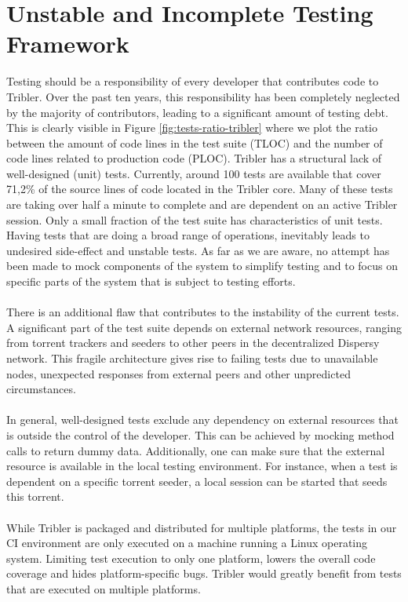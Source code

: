 \section{Unstable and Incomplete Testing Framework}
Testing should be a responsibility of every developer that contributes code to Tribler. Over the past ten years, this responsibility has been completely neglected by the majority of contributors, leading to a significant amount of testing debt. This is clearly visible in Figure \ref{fig:tests-ratio-tribler} where we plot the ratio between the amount of code lines in the test suite (TLOC) and the number of code lines related to production code (PLOC). Tribler has a structural lack of well-designed (unit) tests. Currently, around 100 tests are available that cover 71,2\% of the source lines of code located in the Tribler core. Many of these tests are taking over half a minute to complete and are dependent on an active Tribler session. Only a small fraction of the test suite has characteristics of unit tests. Having tests that are doing a broad range of operations, inevitably leads to undesired side-effect and unstable tests. As far as we are aware, no attempt has been made to mock components of the system to simplify testing and to focus on specific parts of the system that is subject to testing efforts.\\\\
There is an additional flaw that contributes to the instability of the current tests. A significant part of the test suite depends on external network resources, ranging from torrent trackers and seeders to other peers in the decentralized Dispersy network. This fragile architecture gives rise to failing tests due to unavailable nodes, unexpected responses from external peers and other unpredicted circumstances.\\\\
In general, well-designed tests exclude any dependency on external resources that is outside the control of the developer. This can be achieved by mocking method calls to return dummy data. Additionally, one can make sure that the external resource is available in the local testing environment. For instance, when a test is dependent on a specific torrent seeder, a local session can be started that seeds this torrent.\\\\
While Tribler is packaged and distributed for multiple platforms, the tests in our CI environment are only executed on a machine running a Linux operating system. Limiting test execution to only one platform, lowers the overall code coverage and hides platform-specific bugs\cite{beller2016oops}. Tribler would greatly benefit from tests that are executed on multiple platforms.

